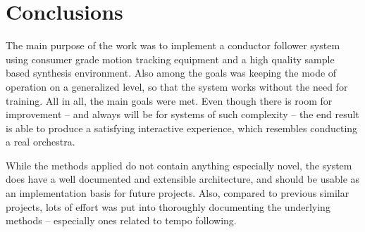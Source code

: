 \section{Conclusions}

The main purpose of the work was to
implement a conductor follower system
using consumer grade motion tracking equipment
and a high quality sample based synthesis environment.
Also among the goals was
keeping the mode of operation on a generalized level,
so that the system works without the need for training.
All in all, the main goals were met.
Even though there is room for improvement --
and always will be for systems of such complexity --
the end result is able to produce
a satisfying interactive experience,
which resembles conducting a real orchestra.

While the methods applied
do not contain anything especially novel,
the system does have a well documented
and extensible architecture,
and should be usable as an implementation
basis for future projects.
Also, compared to previous similar projects,
lots of effort was put into
thoroughly documenting the underlying methods --
especially ones related to tempo following.


